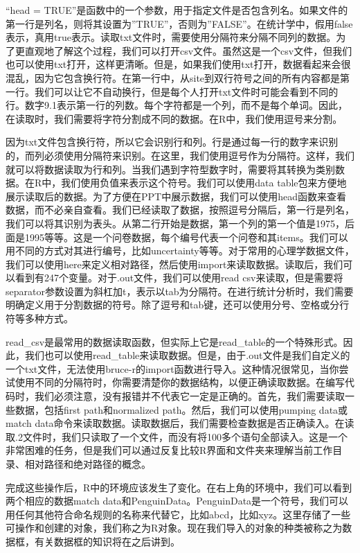 \documentclass[
  oneside]{book}
\begin{document}
``head = TRUE''是函数中的一个参数，用于指定文件是否包含列名。如果文件的第一行是列名，则将其设置为''TRUE''，否则为''FALSE''。在统计学中，假用false表示，真用true表示。读取txt文件时，需要使用分隔符来分隔不同列的数据。为了更直观地了解这个过程，我们可以打开csv文件。虽然这是一个csv文件，但我们也可以使用txt打开，这样更清晰。但是，如果我们使用txt打开，数据看起来会很混乱，因为它包含换行符。在第一行中，从site到双行符号之间的所有内容都是第一行。我们可以让它不自动换行，但是每个人打开txt文件时可能会看到不同的行。数字9.1表示第一行的列数。每个字符都是一个列，而不是每个单词。因此，在读取时，我们需要将字符分割成不同的数据。在R中，我们使用逗号来分割。

因为txt文件包含换行符，所以它会识别行和列。行是通过每一行的数字来识别的，而列必须使用分隔符来识别。在这里，我们使用逗号作为分隔符。这样，我们就可以将数据读取为行和列。当我们遇到字符型数字时，需要将其转换为类别数据。在R中，我们使用负值来表示这个符号。我们可以使用data table包来方便地展示读取后的数据。为了方便在PPT中展示数据，我们可以使用head函数来查看数据，而不必亲自查看。我们已经读取了数据，按照逗号分隔后，第一行是列名，我们可以将其识别为表头。从第二行开始是数据，第一个列的第一个值是1975，后面是1995等等。这是一个问卷数据，每个编号代表一个问卷和其items。我们可以用不同的方式对其进行编号，比如uncertainty等等。对于常用的心理学数据文件，我们可以使用here来定义相对路径，然后使用import来读取数据。读取后，我们可以看到有247个变量。对于.out文件，我们可以使用read csv来读取，但是需要将separator参数设置为斜杠加t，表示以tab为分隔符。在进行统计分析时，我们需要明确定义用于分割数据的符号。除了逗号和tab键，还可以使用分号、空格或分行符等多种方式。

read\_csv是最常用的数据读取函数，但实际上它是read\_table的一个特殊形式。因此，我们也可以使用read\_table来读取数据。但是，由于.out文件是我们自定义的一个txt文件，无法使用bruce-r的import函数进行导入。这种情况很常见，当你尝试使用不同的分隔符时，你需要清楚你的数据结构，以便正确读取数据。在编写代码时，我们必须注意，没有报错并不代表它一定是正确的。首先，我们需要读取一些数据，包括first path和normalized path。然后，我们可以使用pumping data或match data命令来读取数据。读取数据后，我们需要检查数据是否正确读入。在读取.2文件时，我们只读取了一个文件，而没有将100多个语句全部读入。这是一个非常困难的任务，但是我们可以通过反复比较R界面和文件夹来理解当前工作目录、相对路径和绝对路径的概念。

完成这些操作后，R中的环境应该发生了变化。在右上角的环境中，我们可以看到两个相应的数据match data和PenguinData。PenguinData是一个符号，我们可以用任何其他符合命名规则的名称来代替它，比如abcd，比如xyz。这里存储了一些可操作和创建的对象，我们称之为R对象。现在我们导入的对象的种类被称之为数据框，有关数据框的知识将在之后讲到。
\end{document}
